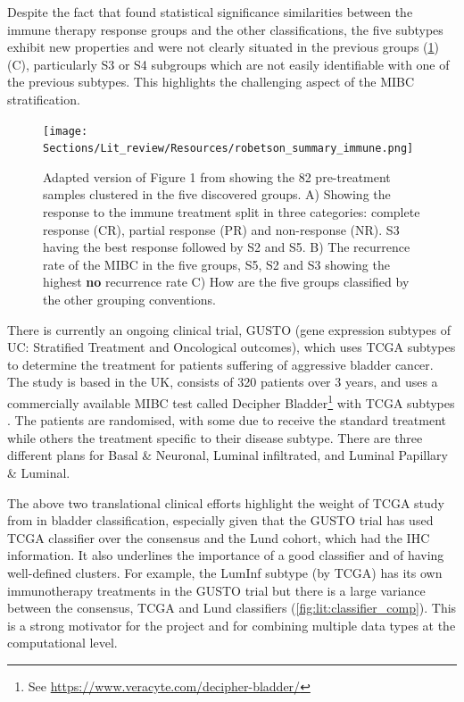 Despite the fact that \citeauthor{Robertson2023-na} found statistical significance similarities between the immune therapy response groups and the other classifications, the five subtypes exhibit new properties and were not clearly situated in the previous groups (\cref{fig:lit:immune_rob}) (C), particularly S3 or S4 subgroups which are not easily identifiable with one of the previous subtypes. This highlights the challenging aspect of the MIBC stratification.


\begin{figure}[!htb]    
    \centering
    \texttt{[image: Sections/Lit\_review/Resources/robetson\_summary\_immune.png]}
    \caption[MIBC subtypes based on the response to immunotherapy]{Adapted version of Figure 1 from \cite{Robertson2023-na} showing the 82 pre-treatment samples clustered in the five discovered groups. A) Showing the response to the immune treatment split in three categories: complete response (CR), partial response (PR) and non-response (NR). S3 having the best response followed by S2 and S5. B) The recurrence rate of the MIBC in the five groups, S5, S2 and S3 showing the highest \textbf{no} recurrence rate C) How are the five groups classified by the other grouping conventions.}
    \label{fig:lit:immune_rob}
\end{figure}


There is currently an ongoing clinical trial, GUSTO (gene expression subtypes of \gls{UC}: Stratified Treatment and Oncological outcomes), which uses TCGA subtypes to determine the treatment for patients suffering of aggressive bladder cancer. The study is based in the UK, consists of 320 patients over 3 years, and uses a commercially available MIBC test called Decipher Bladder\footnote{See \url{https://www.veracyte.com/decipher-bladder/}} with TCGA subtypes \citep{Griffin2024-zr}. The patients are randomised, with some  due to receive the standard treatment while others the treatment specific to their disease subtype. There are three different plans for Basal \& Neuronal, Luminal infiltrated, and Luminal Papillary \& Luminal.

The above two translational clinical efforts highlight the weight of TCGA study from \citet{Robertson2017-mg} in bladder classification, especially given that the GUSTO trial has used TCGA classifier over the consensus and the Lund cohort, which had the IHC information. It also underlines the importance of a good classifier and of having well-defined clusters. For example, the LumInf subtype (by TCGA) has its own immunotherapy treatments in the GUSTO trial but there is a large variance between the consensus, TCGA and Lund classifiers (\cref{fig:lit:classifier_comp}). This is a strong motivator for the project and for combining multiple data types at the computational level.



